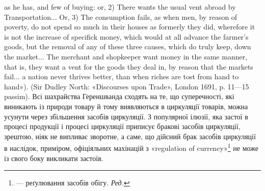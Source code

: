 as he has, and few of buying: or, 2) There wants the usual vent abroad by
Transportation... Or, 3) The consumption fails, as when men, by reason of
poverty, do not spend so much in their houses as formerly they did, wherefore
it is not the increase of specifick money, which would at all advance
the farmer’s goods, but the removal of any of these three causes, which
do truly keep, down the market... The merchant and shopkeeper want money
in the same manner, that is, they want a vent for the goods they deal in,
by reason that the markets fail... a nation never thrives better, than when
riches are tost from hand to hand»). (Sir Dudley North: «Discourses upon
Trade», London 1691, p. 11—15 passim). Всі шахрайства Гереншванда
сходять на те, що суперечності, які виникають із природи товару й тому
виявляються в циркуляції товарів, можна усунути через збільшення
засобів циркуляції. З популярної ілюзії, яка застої в процесі продукції
і процесі циркуляції приписує бракові засобів циркуляції, зрештою,
ніяк не випливає зворотне, а саме, що дійсний брак засобів циркуляції
в наслідок, приміром, офіціяльних махінацій з «regulation of
currency»\footnote*{
— реґулювання засобів обігу. \emph{Ред.}
} не може із свого боку викликати застоїв.